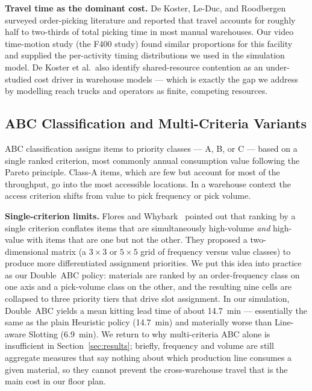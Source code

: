 \medskip
\noindent\textbf{Travel time as the dominant cost.}
De Koster, Le-Duc, and Roodbergen~\cite{dekoster2007} surveyed order-picking
literature and reported that travel accounts for roughly half to two-thirds
of total picking time in most manual warehouses.
Our video time-motion study (the F400 study) found similar proportions for
this facility and supplied the per-activity timing distributions we used in
the simulation model.
De Koster et al.\ also identify shared-resource contention as an
under-studied cost driver in warehouse models — which is exactly the gap we
address by modelling reach trucks and operators as finite, competing
resources.

\subsection{ABC Classification and Multi-Criteria Variants}\label{subsec:abc}

ABC classification assigns items to priority classes — A, B, or C —
based on a single ranked criterion, most commonly annual consumption value
following the Pareto principle.
Class-A items, which are few but account for most of the throughput, go into
the most accessible locations.
In a warehouse context the access criterion shifts from value to pick
frequency or pick volume.

\medskip
\noindent\textbf{Single-criterion limits.}
Flores and Whybark~\cite{flores1986} pointed out that ranking by a single
criterion conflates items that are simultaneously high-volume \emph{and}
high-value with items that are one but not the other.
They proposed a two-dimensional matrix (a $3 \times 3$ or $5 \times 5$
grid of frequency versus value classes) to produce more differentiated
assignment priorities.
We put this idea into practice as our Double~ABC policy: materials are
ranked by an order-frequency class on one axis and a pick-volume class on
the other, and the resulting nine cells are collapsed to three priority
tiers that drive slot assignment.
In our simulation, Double~ABC yields a mean kitting lead time of about
\SI{14.7}{\minute} — essentially the same as the plain Heuristic policy
(\SI{14.7}{\minute}) and materially worse than Line-aware Slotting
(\SI{6.9}{\minute}).
We return to why multi-criteria ABC alone is insufficient in
Section~\ref{sec:results}; briefly, frequency and volume are still
aggregate measures that say nothing about which production line consumes a
given material, so they cannot prevent the cross-warehouse travel that is
the main cost in our floor plan.

